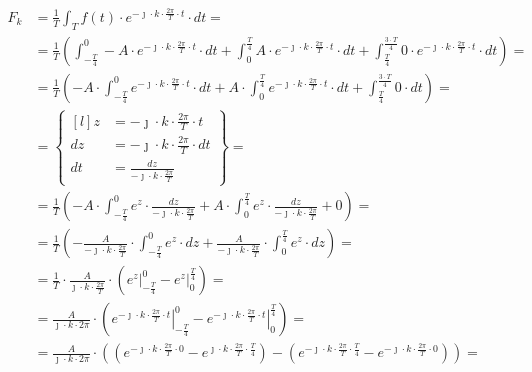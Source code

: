 \begin{task}
\begin{align*}
F_k&=\frac{1}{T}\int_{T}f(t) \cdot e^{-\jmath \cdot k \cdot \frac{2\pi}{T} \cdot t} \cdot dt=\\
&=\frac{1}{T}\left(\int_{-\frac{T}{4}}^{0} -A \cdot e^{-\jmath \cdot k \cdot \frac{2\pi}{T} \cdot t} \cdot dt 
+ \int_{0}^{\frac{T}{4}} A \cdot e^{-\jmath \cdot k \cdot \frac{2\pi}{T} \cdot t} \cdot dt
+ \int_{\frac{T}{4}}^{\frac{3\cdot T}{4}} 0 \cdot e^{-\jmath \cdot k \cdot \frac{2\pi}{T} \cdot t} \cdot dt \right)=\\
&=\frac{1}{T}\left(-A \cdot \int_{-\frac{T}{4}}^{0} e^{-\jmath \cdot k \cdot \frac{2\pi}{T} \cdot t} \cdot dt 
+ A \cdot \int_{0}^{\frac{T}{4}} e^{-\jmath \cdot k \cdot \frac{2\pi}{T} \cdot t} \cdot dt
+ \int_{\frac{T}{4}}^{\frac{3\cdot T}{4}} 0 \cdot dt \right)=\\
&=\begin{Bmatrix*}[l]
z&=-\jmath \cdot k \cdot \frac{2\pi}{T} \cdot t \\
dz&=-\jmath \cdot k \cdot \frac{2\pi}{T} \cdot dt \\
dt&=\frac{dz}{-\jmath \cdot k \cdot \frac{2\pi}{T}}
\end{Bmatrix*} =\\
&=\frac{1}{T}\left(-A \cdot \int_{-\frac{T}{4}}^{0} e^{ z } \cdot \frac{dz}{-\jmath \cdot k \cdot \frac{2\pi}{T}} 
+ A \cdot \int_{0}^{\frac{T}{4}} e^{ z } \cdot \frac{dz}{-\jmath 
 \cdot k \cdot \frac{2\pi}{T}}
+ 0 \right)=\\
&=\frac{1}{T}\left(-\frac{A}{-\jmath \cdot k \cdot \frac{2\pi}{T}} \cdot \int_{-\frac{T}{4}}^{0} e^{ z } \cdot dz 
+ \frac{A}{-\jmath \cdot k \cdot \frac{2\pi}{T}} \cdot \int_{0}^{\frac{T}{4}} e^{ z } \cdot dz\right)=\\
&=\frac{1}{T} \cdot \frac{A}{\jmath \cdot k \cdot \frac{2\pi}{T}} \cdot \left( \left. e^{ z } \right|_{-\frac{T}{4}}^{0}
- \left. e^{ z }\right|_{0}^{\frac{T}{4}} \right)=\\
&=\frac{A}{\jmath \cdot k \cdot 2\pi} \cdot \left( \left. e^{ -\jmath \cdot k \cdot \frac{2\pi}{T} \cdot t  } \right|_{-\frac{T}{4}}^{0}
- \left. e^{ -\jmath \cdot k \cdot \frac{2\pi}{T} \cdot t  }\right|_{0}^{\frac{T}{4}} \right)=\\
&=\frac{A}{\jmath \cdot k \cdot 2\pi} \cdot \left(\left( e^{ -\jmath \cdot k \cdot \frac{2\pi}{T} \cdot 0  } - e^{ \jmath \cdot  k \cdot \frac{2\pi}{T} \cdot \frac{T}{4}  } \right)
- \left( e^{ -\jmath \cdot k \cdot \frac{2\pi}{T} \cdot \frac{T}{4}  } - e^{ -\jmath \cdot k \cdot \frac{2\pi}{T} \cdot 0  }\right) \right)=\\

\end{align*}
\end{task}
